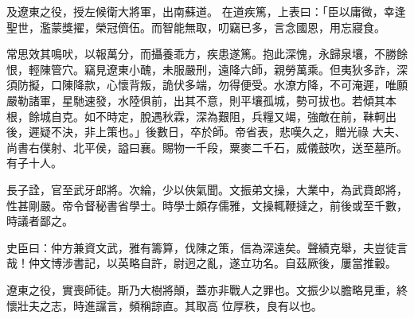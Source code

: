 \begin{pinyinscope}
 及遼東之役，授左候衛大將軍，出南蘇道。
 在道疾篤，上表曰：「臣以庸微，幸逢聖世，濫蒙獎擢，榮冠儕伍。而智能無取，叨竊已多，言念國恩，用忘寢食。



 常思效其鳴吠，以報萬分，而攝養乖方，疾患遂篤。抱此深愧，永歸泉壤，不勝餘恨，輕陳管穴。竊見遼東小醜，未服嚴刑，遠降六師，親勞萬乘。但夷狄多詐，深須防擬，口陳降款，心懷背叛，詭伏多端，勿得便受。水潦方降，不可淹遲，唯願嚴勒諸軍，星馳速發，水陸俱前，出其不意，則平壤孤城，勢可拔也。若傾其本根，餘城自克。如不時定，脫遇秋霖，深為艱阻，兵糧又竭，強敵在前，靺軻出後，遲疑不決，非上策也。」後數日，卒於師。帝省表，悲嘆久之，贈光祿
 大夫、尚書右僕射、北平侯，謚曰襄。賜物一千段，粟麥二千石，威儀鼓吹，送至墓所。有子十人。



 長子詮，官至武牙郎將。次綸，少以俠氣聞。文振弟文操，大業中，為武賁郎將，性甚剛嚴。帝令督秘書省學士。時學士頗存儒雅，文操輒鞭撻之，前後或至千數，時議者鄙之。



 史臣曰：仲方兼資文武，雅有籌算，伐陳之策，信為深遠矣。聲績克舉，夫豈徒言哉！仲文博涉書記，以英略自許，尉迥之亂，遂立功名。自茲厥後，屢當推轂。



 遼東之役，實喪師徒。斯乃大樹將顛，蓋亦非戰人之罪也。文振少以膽略見重，終懷壯夫之志，時進讜言，頻稱諒直。其取高
 位厚秩，良有以也。



\end{pinyinscope}